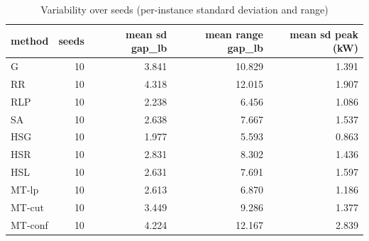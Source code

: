 \begin{table}[htbp]
\centering
\small
\caption{Variability over seeds (per-instance standard deviation and range)}
\label{tab:E2_head_to_head_seeds}
\begin{tabular}{lrrrr}
\toprule
method & seeds & mean sd gap\_lb & mean range gap\_lb & mean sd peak (kW) \\
\midrule
G & 10 & 3.841 & 10.829 & 1.391 \\
RR & 10 & 4.318 & 12.015 & 1.907 \\
RLP & 10 & 2.238 & 6.456 & 1.086 \\
SA & 10 & 2.638 & 7.667 & 1.537 \\
HSG & 10 & 1.977 & 5.593 & 0.863 \\
HSR & 10 & 2.831 & 8.302 & 1.436 \\
HSL & 10 & 2.631 & 7.691 & 1.597 \\
MT-lp & 10 & 2.613 & 6.870 & 1.186 \\
MT-cut & 10 & 3.449 & 9.286 & 1.377 \\
MT-conf & 10 & 4.224 & 12.167 & 2.839 \\
\bottomrule
\end{tabular}
\end{table}
